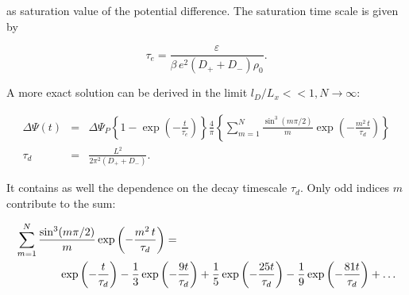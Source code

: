 \documentclass[aps,pre,preprint,groupedaddress]{revtex4-1}
\begin{document}
as saturation value of the potential difference.
The saturation time scale is given by

\begin{equation}
\tau_e=\frac{\varepsilon}{\beta \, e^2 (D_+ + D_-) \rho_0}.
\end{equation}

A more exact solution can be derived in the limit $l_D/L_x<<1, N\to\infty$: 
 
\begin{eqnarray}
\Delta\Psi(t)&=&\Delta\Psi_P \left\{1-\exp\left(-\frac{t}{\tau_e}\right)\right\}\frac{4}{\pi}\left\{\sum_{m=1}^N \frac{\sin^3(m\pi/2)}{m} \exp\left(-\frac{ m^2\, t}{\tau_d}\right)\right\}\\
\tau_d&=&\frac{L^2}{2\pi^2 (D_+ + D_-)}.\label{taud}
\end{eqnarray}

It contains as well the dependence on the decay timescale $\tau_d$.
Only odd indices $m$ contribute to the sum:
 
\begin{eqnarray}
\sum_{m=1}^N \frac{\sin^3(m\pi/2)}{m} \exp\left(-\frac{m^2\, t}{\tau_d}\right)&=&\nonumber\\
&&\hspace*{-4cm} \exp\left(-\frac{t}{\tau_d}\right)-\frac{1}{3} \exp\left(-\frac{9 t}{\tau_d}\right)+\frac{1}{5}\exp\left(-\frac{25t}{\tau_d}\right)-\frac{1}{9}\exp\left(-\frac{81 t}{\tau_d}\right)+\ldots
\end{eqnarray}
\end{document}
